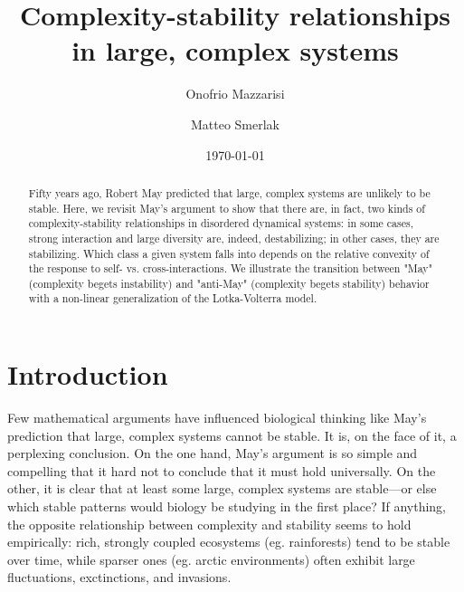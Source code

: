 \documentclass[%
 reprint,
 amsmath,amssymb,
 aps,
]{revtex4-2}
\begin{document}
\title{Complexity-stability relationships in large, complex systems}

\author{Onofrio Mazzarisi}
\author{Matteo Smerlak}



\date{\today}%

\begin{abstract}
Fifty years ago, Robert May predicted that large, complex systems are unlikely to be stable. Here, we revisit May's argument to show that there are, in fact, two kinds of complexity-stability relationships in disordered dynamical systems: in some cases, strong interaction and large diversity are, indeed, destabilizing; in other cases, they are stabilizing. Which class a given system falls into depends on the relative convexity of the response to self- vs. cross-interactions. We illustrate the transition between "May" (complexity begets instability) and "anti-May" (complexity begets stability) behavior with a non-linear  generalization of the Lotka-Volterra model. 
\end{abstract}

\maketitle

\section{Introduction}

Few mathematical arguments have influenced biological thinking like May's prediction that large, complex systems cannot be stable. It is, on the face of it, a perplexing conclusion. On the one hand, May's argument is so simple and compelling that it hard not to conclude that it must hold universally. On the other, it is clear that at least some large, complex systems are stable---or else which stable patterns would biology be studying in the first place? If anything, the opposite relationship between complexity and stability seems to hold empirically: rich, strongly coupled ecosystems (eg. rainforests) tend to be  stable over time, while sparser ones (eg. arctic environments) often exhibit large fluctuations, exctinctions, and invasions. 
\end{document}
